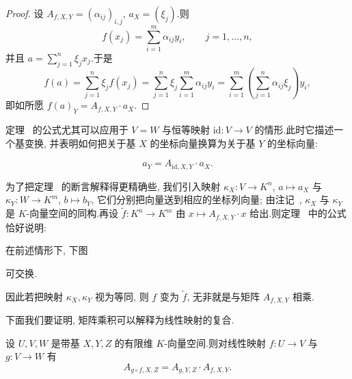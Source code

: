\begin{proof}
设 $A_{f, X, Y} = (\alpha_{ij})_{i, j}$, $a_X = (\xi_j)$.则
\[
f(x_j) = \sum_{i = 1}^{m}\alpha_{ij}y_i, \qquad j = 1, \ldots, n,
\]
并且 $a = \sum_{j = 1}^{n}\xi_j x_j$.于是
\[
f(a) = \sum_{j = 1}^{n}\xi_j f(x_j) = \sum_{j = 1}^{n}\xi_j\sum_{i = 1}^{m}\alpha_{ij}y_i
= \sum_{i = 1}^{m}\left(\sum_{j = 1}^{n}\alpha_{ij}\xi_j\right)y_i,
\]
即如所愿 $f(a)_Y = A_{f, X, Y} \cdot a_X$.
\end{proof}

定理~ 的公式尤其可以应用于 $V = W$ 与恒等映射 $\mathrm{id} \colon V \longrightarrow V$ 的情形.此时它描述一个基变换, 并表明如何把关于基 $X$ 的坐标向量换算为关于基 $Y$ 的坐标向量:

\[
a_Y = A_{\mathrm{id}, X, Y} \cdot a_X\text{.}
\]

为了把定理~ 的断言解释得更精确些, 我们引入映射 $\kappa_X \colon V \longrightarrow K^n$, $a \longmapsto a_X$ 与 $\kappa_Y \colon W \longrightarrow K^m$, $b \longmapsto b_Y$, 它们分别把向量送到相应的坐标列向量; 由注记~, $\kappa_X$ 与 $\kappa_Y$ 是 $K$-向量空间的同构.再设 $\tilde{f} \colon K^n \longrightarrow K^m$ 由 $x \longmapsto A_{f, X, Y} \cdot x$ 给出.则定理~ 中的公式恰好说明:

\begin{corollary}\label{cor:3.1.8}
在前述情形下, 下图
\begin{center}
\end{center}
可交换.
\end{corollary}

因此若把映射 $\kappa_X, \kappa_Y$ 视为等同, 则 $f$ 变为 $\tilde{f}$, 无非就是与矩阵 $A_{f, X, Y}$ 相乘.

下面我们要证明, 矩阵乘积可以解释为线性映射的复合.

\begin{theorem}\label{thm:3.1.9}
设 $U, V, W$ 是带基 $X, Y, Z$ 的有限维 $K$-向量空间.则对线性映射 $f \colon U \longrightarrow V$ 与 $g \colon V \longrightarrow W$ 有
\[
A_{g \circ f, X, Z} = A_{g, Y, Z} \cdot A_{f, X, Y}\text{.}
\]
\end{theorem}

